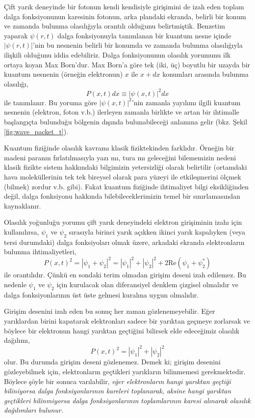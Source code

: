 \documentclass[a4paper,12pt, twoside]{article}
\begin{document}
Çift yarık deneyinde bir fotonun kendi kendisiyle girişimini de izah eden toplam dalga fonksiyonunun karesinin fotonun, arka plandaki ekranda, belirli bir konum ve zamanda bulunma olasılığıyla orantılı olduğunu belirtmiştik. Benzetim yaparak $\psi(r,t)$ dalga fonksiyonuyla tanımlanan bir kuantum nesne içinde $|\psi(r,t)|$'nin bu nesnenin belirli bir konumda ve zamanda bulunma olasılığıyla ilişkili olduğunu iddia edebiliriz. Dalga fonksiyonunun olasılık yorumunu ilk ortaya koyan Max Born'dur. Max Born'a göre tek (iki, üç) boyutlu bir uzayda bir kuantum nesnenin (örneğin elektronun) $x$ ile $x+dx$ konumları arasında bulunma olasılığı,
\begin{equation}
P(x,t) dx \equiv |\psi(x,t)|^2 dx
\label{eq:probability_interp}
\end{equation}
ile tanımlanır. Bu yoruma göre $|\psi(x,t)|^2$'nin zamanla yayılımı ilgili kuantum nesnenin (elektron, foton v.b.) ilerleyen zamanla birlikte ve artan bir ihtimalle başlangıçta bulunduğu bölgenin dışında bulunabileceği anlamına gelir (bkz. Şekil \ref{fig:wave_packet_t}).

Kuantum fiziğinde olasılık kavramı klasik fiziktekinden farklıdır. Örneğin bir madeni paranın fırlatılmasıyla yazı mı, tura mı geleceğini bilememizin nedeni klasik fizikte sistem hakkındaki bilgimizin yetersizliği olarak belirtilir (ortamdaki hava moleküllerinin tek tek bireysel olarak para yüzeyi ile etkileşmerini ölçmek (bilmek) zordur v.b. gibi). Fakat kuantum fiziğinde ihtimaliyet bilgi eksikliğinden değil, dalga fonksiyonu hakkında bilebileceklerimizin temel bir sınırlamasından kaynaklanır.

Olasılık yoğunluğu yorumu çift yarık deneyindeki elektron girişiminin izahı için kullanılırsa, $\psi_1$ ve $\psi_2$ sırasıyla birinci yarık açıkken ikinci yarık kapalıyken (veya tersi durumdaki) dalga fonksiyoları olmak üzere, arkadaki ekranda elektronların bulunma ihtimaliyetleri,
\begin{equation}
P(x,t)^2 = |\psi_1 + \psi_2|^2 = |\psi_1 |^2 + |\psi_2|^2 + 2\text{Re}(\psi_1 + \psi_2^*)
\label{eq:interference_probability}
\end{equation}
ile orantılıdır. Çünkü en sondaki terim olmadan girişim deseni izah edilemez. Bu nedenle $\psi_1$ ve $\psi_2$ için kurulacak olan diferansiyel denklem çizgisel olmalıdır ve dalga fonksiyonlarının üst üste gelmesi kuralına uygun olmalıdır.

Girişim desenini izah eden bu sonuç her zaman gözlenemeyebilir. Eğer yarıklardan birini kapatarak elektronları sadece bir yarıktan geçmeye zorlarsak ve böylece bir elektronun hangi yarıktan geçtiğini bilirsek elde edeceğimiz olasılık dağılımı,
\begin{equation}
P(x,t)^2 = |\psi_1 |^2 + |\psi_2|^2
\label{eq:classical_probability}
\end{equation}
olur. Bu durumda girişim deseni gözlenemez. Demek ki; girişim desenini gözleyebilmek için, elektronların geçtikleri yarıkların bilinmemesi gerekmektedir. Böylece şöyle bir sonuca varılabilir, \emph{eğer elektronların hangi yarıktan geçtiği biliniyorsa dalga fonksiyonlarının kareleri toplanarak, aksine hangi yarıktan geçtikleri bilinmiyorsa dalga fonksiyonlarının toplamlarının karesi alınarak olasılık dağılımları bulunur.}
\end{document}
